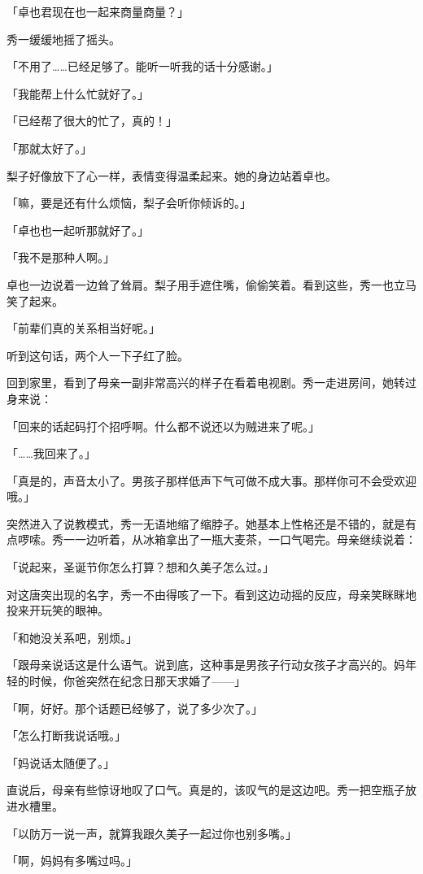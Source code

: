 \documentclass[UTF8]{ctexart}
\begin{document}
    「卓也君现在也一起来商量商量？」

    秀一缓缓地摇了摇头。

    「不用了……已经足够了。能听一听我的话十分感谢。」

    「我能帮上什么忙就好了。」

    「已经帮了很大的忙了，真的！」

    「那就太好了。」

    梨子好像放下了心一样，表情变得温柔起来。她的身边站着卓也。

    「嘛，要是还有什么烦恼，梨子会听你倾诉的。」

    「卓也也一起听那就好了。」

    「我不是那种人啊。」

    卓也一边说着一边耸了耸肩。梨子用手遮住嘴，偷偷笑着。看到这些，秀一也立马笑了起来。

    「前辈们真的关系相当好呢。」

    听到这句话，两个人一下子红了脸。

    回到家里，看到了母亲一副非常高兴的样子在看着电视剧。秀一走进房间，她转过身来说：

    「回来的话起码打个招呼啊。什么都不说还以为贼进来了呢。」

    「……我回来了。」

    「真是的，声音太小了。男孩子那样低声下气可做不成大事。那样你可不会受欢迎哦。」

    突然进入了说教模式，秀一无语地缩了缩脖子。她基本上性格还是不错的，就是有点啰嗦。秀一一边听着，从冰箱拿出了一瓶大麦茶，一口气喝完。母亲继续说着：

    「说起来，圣诞节你怎么打算？想和久美子怎么过。」

    对这唐突出现的名字，秀一不由得咳了一下。看到这边动摇的反应，母亲笑眯眯地投来开玩笑的眼神。

    「和她没关系吧，别烦。」

    「跟母亲说话这是什么语气。说到底，这种事是男孩子行动女孩子才高兴的。妈年轻的时候，你爸突然在纪念日那天求婚了——」

    「啊，好好。那个话题已经够了，说了多少次了。」

    「怎么打断我说话哦。」

    「妈说话太随便了。」

    直说后，母亲有些惊讶地叹了口气。真是的，该叹气的是这边吧。秀一把空瓶子放进水槽里。

    「以防万一说一声，就算我跟久美子一起过你也别多嘴。」

    「啊，妈妈有多嘴过吗。」
\end{document}

